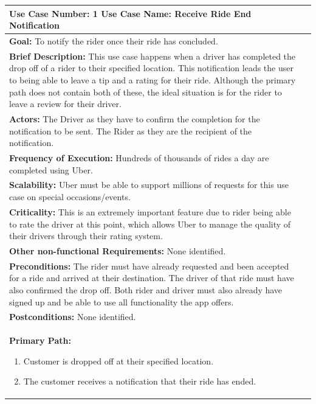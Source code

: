 \documentclass{article}
\begin{document}
    \begin{center}      
    \begin{tabular}[H]{|p{14cm}|p{6cm}|}
      \hline
      \textbf{Use Case Number:} 1 \vline \textbf{Use Case Name:} Receive Ride End Notification \\
      \hline
      \textbf{Goal:} To notify the rider once their ride has concluded. \\
      \hline
      \textbf{Brief Description:} This use case happens when a driver has completed the drop off of a rider to their specified location. This notification leads the user
      to being able to leave a tip and a rating for their ride. Although the primary path does not contain both of these, the ideal situation is for the rider to leave a review
      for their driver. \\
      \hline
      \textbf{Actors:} \newline The Driver as they have to confirm the completion for the notification to be sent. \newline The Rider as they are the recipient of the notification. \\
      \hline
      \textbf{Frequency of Execution:} Hundreds of thousands of rides a day are completed using Uber. \\
      \hline
      \textbf{Scalability:} Uber must be able to support millions of requests for this use case on special occasions/events. \\
      \hline
      \textbf{Criticality:} This is an extremely important feature due to rider being able to rate the driver at this point, which allows Uber to manage the quality of their drivers through their rating system. \\
      \hline
      \textbf{Other non-functional Requirements:} None identified. \\
      \hline
      \textbf{Preconditions:} The rider must have already requested and been accepted for a ride and arrived at their destination. The driver of that ride must have also confirmed the drop off.
      Both rider and driver must also already have signed up and be able to use all functionality the app offers. \\
      \hline
      \textbf{Postconditions:} None identified. \\
      \hline
      \textbf{Primary Path:} 
      \begin{enumerate}
        \item Customer is dropped off at their specified location.
        \item The customer receives a notification that their ride has ended.

\end{enumerate}
\end{tabular}
\end{center}
\end{document}
